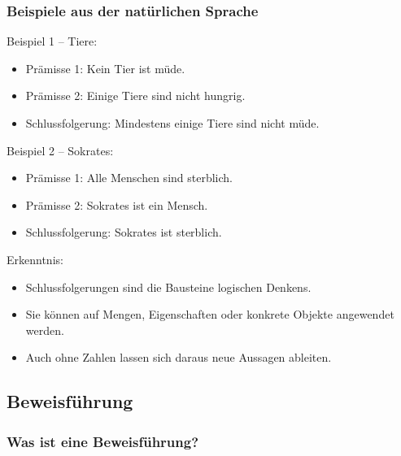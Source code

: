\documentclass{article}
\begin{document}
    \subsubsection{Beispiele aus der natürlichen Sprache}
    
Beispiel 1 – Tiere:

    \begin{itemize}
      \item Prämisse 1: Kein Tier ist müde.

      \item Prämisse 2: Einige Tiere sind nicht hungrig.

      \item Schlussfolgerung: Mindestens einige Tiere sind nicht müde.

    \end{itemize}

    
Beispiel 2 – Sokrates:

    \begin{itemize}
      \item Prämisse 1: Alle Menschen sind sterblich.

      \item Prämisse 2: Sokrates ist ein Mensch.

      \item Schlussfolgerung: Sokrates ist sterblich.

    \end{itemize}

    
Erkenntnis:

    \begin{itemize}
      \item Schlussfolgerungen sind die Bausteine logischen Denkens.

      \item Sie können auf Mengen, Eigenschaften oder konkrete Objekte angewendet werden.

      \item Auch ohne Zahlen lassen sich daraus neue Aussagen ableiten.

    \end{itemize}
  


  
  
    
      \subsection{Beweisführung}
    
      \subsubsection{Was ist eine Beweisführung?}
      
\end{document}
